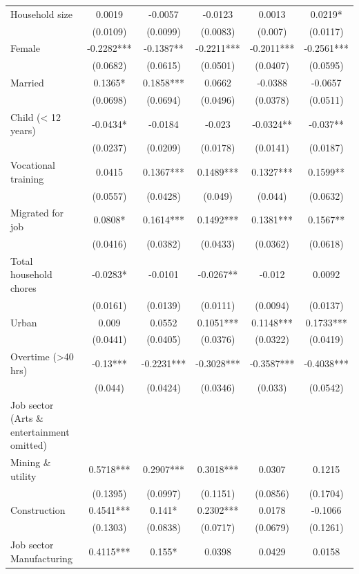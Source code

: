 \begin{table}[htbp]
{\begin{tabular}{lccccc}
\addlinespace
Household size & 0.0019 & -0.0057 & -0.0123 & 0.0013 & 0.0219* \\
& (0.0109) & (0.0099) & (0.0083) & (0.007) & (0.0117) \\
Female & -0.2282*** & -0.1387** & -0.2211*** & -0.2011*** & -0.2561*** \\
& (0.0682) & (0.0615) & (0.0501) & (0.0407) & (0.0595) \\
Married & 0.1365* & 0.1858*** & 0.0662 & -0.0388 & -0.0657 \\
& (0.0698) & (0.0694) & (0.0496) & (0.0378) & (0.0511) \\
Child (< 12 years) & -0.0434* & -0.0184 & -0.023 & -0.0324** & -0.037** \\
& (0.0237) & (0.0209) & (0.0178) & (0.0141) & (0.0187) \\
Vocational training & 0.0415 & 0.1367*** & 0.1489*** & 0.1327*** & 0.1599** \\
& (0.0557) & (0.0428) & (0.049) & (0.044) & (0.0632) \\
Migrated for job & 0.0808* & 0.1614*** & 0.1492*** & 0.1381*** & 0.1567** \\
& (0.0416) & (0.0382) & (0.0433) & (0.0362) & (0.0618) \\
Total household chores & -0.0283* & -0.0101 & -0.0267** & -0.012 & 0.0092 \\
& (0.0161) & (0.0139) & (0.0111) & (0.0094) & (0.0137) \\
Urban & 0.009 & 0.0552 & 0.1051*** & 0.1148*** & 0.1733*** \\
& (0.0441) & (0.0405) & (0.0376) & (0.0322) & (0.0419) \\
Overtime (>40 hrs) & -0.13*** & -0.2231*** & -0.3028*** & -0.3587*** & -0.4038*** \\
& (0.044) & (0.0424) & (0.0346) & (0.033) & (0.0542) \\
Job sector (Arts \& entertainment omitted) &&&&& \\
\hspace{1em}Mining \& utility & 0.5718*** & 0.2907*** & 0.3018*** & 0.0307 & 0.1215 \\
& (0.1395) & (0.0997) & (0.1151) & (0.0856) & (0.1704) \\
\hspace{1em}Construction & 0.4541*** & 0.141* & 0.2302*** & 0.0178 & -0.1066 \\
& (0.1303) & (0.0838) & (0.0717) & (0.0679) & (0.1261) \\
\hspace{1em}Job sector Manufacturing & 0.4115*** & 0.155* & 0.0398 & 0.0429 & 0.0158 \\

\end{tabular}}
\end{table}
